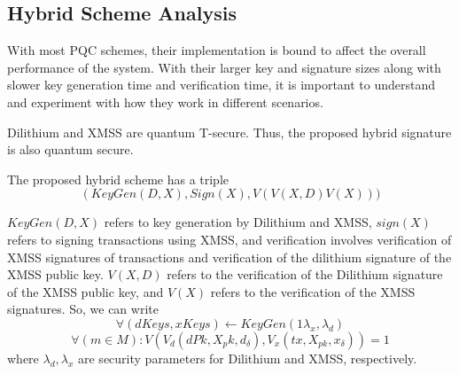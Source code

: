 \documentclass[lettersize,journal]{IEEEtran}
\begin{document}



\subsection{Hybrid Scheme Analysis} 
With most PQC schemes, their implementation is bound to affect
the overall performance of the system.
With their larger key and signature sizes along with slower
key generation time and verification time, it is important to
understand and experiment with how they work in different scenarios.

\begin{prop}
Dilithium and XMSS are quantum T-secure. Thus, the proposed hybrid signature is also quantum secure.
\end{prop}

The proposed hybrid scheme has a triple $$ \left (KeyGen (D, X), Sign (X), V (V (X, D) V (X)))\right.$$

$KeyGen(D,X)$ refers to key generation by Dilithium and XMSS, $sign(X)$ refers to signing transactions using XMSS, and verification involves verification of XMSS signatures of transactions and
verification of the dilithium signature of the XMSS public key.
$V(X,D)$ refers to the verification of the Dilithium signature of the XMSS public key, and
$V(X)$ refers to the verification of the XMSS signatures.
So, we can write
$$\forall (dKeys, xKeys) \leftarrow KeyGen (1{\lambda_x, \lambda_d})$$
$$\forall (m \in M): V(V_d(dPk, X_pk, d_\delta), V_x (tx, X_{pk}, x_\delta)) = 1$$ 
where $\lambda_d, \lambda_x$ are security parameters for Dilithium and XMSS, respectively.
\end{document}
